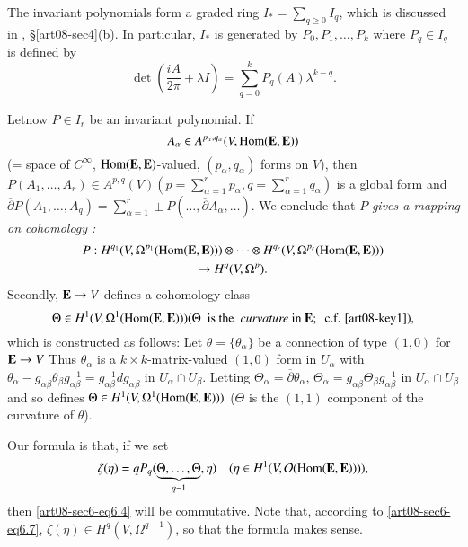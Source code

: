 The invariant polynomials form a graded ring $I_{*}=\sum\limits_{q\geq 0}I_{q}$, which is discussed in \cite{art08-key11}, \S\ref{art08-sec4}(b). In particular, $I_{*}$ is generated by $P_{0},P_{1},\ldots,P_{k}$ where $P_{q}\in I_{q}$ is defined by
\begin{equation}
\det\left(\dfrac{iA}{2\pi}+\lambda I\right)=\sum\limits^{k}_{q=0}P_{q}(A)\lambda^{k-q}.\label{art08-sec6-eq6.6}
\end{equation}

Let\pageoriginale now $P\in I_{r}$ be an invariant polynomial. If
$$
A_{\alpha}\in A^{p_{\alpha},q_{\alpha}}(V,\operatorname{\mathrm{Hom}}(\mathbf{E},\mathbf{E}))
$$
(= space of $C^{\infty}$, $\operatorname{\mathrm{Hom}}(\mathbf{E},\mathbf{E})$-valued, $(p_{\alpha},q_{\alpha})$ forms on $V$), then $P(A_{1},\ldots,A_{r})\in A^{p,q}(V)\left(p=\sum\limits^{r}_{\alpha=1}p_{\alpha},q=\sum\limits^{r}_{\alpha=1}q_{\alpha}\right)$ is a global form and $\overline{\partial}P(A_{1},\ldots,A_{q})=\sum\limits^{r}_{\alpha=1}\pm P(\ldots,\overline{\partial}A_{\alpha},\ldots)$. We conclude that $P$ {\em gives a mapping on cohomology :}
\begin{gather}
P : H^{q_{1}}(V,\Omega^{p_{1}}(\operatorname{\mathrm{Hom}}(\mathbf{E},\mathbf{E})))\otimes\cdots\otimes H^{q_{r}}(V,\Omega^{p_{r}}(\operatorname{\mathrm{Hom}}(\mathbf{E},\mathbf{E})))\notag\\
\to H^{q}(V,\Omega^{p}).\label{art08-sec6-eq6.7}
\end{gather}
Secondly, $\mathbf{E}\to V$ defines a cohomology class
$$
\Theta\in H^{1}(V,\Omega^{1}(\operatorname{\mathrm{Hom}}(\mathbf{E},\mathbf{E}))) (\Theta \text{~ is the~ {\em curvature} in } \mathbf{E};\text{~ c.f. \cite{art08-key1}}),
$$
which is constructed as follows: Let $\theta=\{\theta_{\alpha}\}$ be a connection of type $(1,0)$ for $\mathbf{E}\to V$ Thus $\theta_{\alpha}$ is a $k\times k$-matrix-valued $(1,0)$ form in $U_{\alpha}$ with $\theta_{\alpha}-g_{\alpha\beta}\theta_{\beta}g^{-1}_{\alpha\beta}=g^{-1}_{\alpha\beta}dg_{\alpha\beta}$ in $U_{\alpha}\cap U_{\beta}$. Letting $\Theta_{\alpha}=\overline{\partial}\theta_{\alpha}$, $\Theta_{\alpha}=g_{\alpha\beta}\Theta_{\beta}g^{-1}_{\alpha\beta}$ in $U_{\alpha}\cap U_{\beta}$ and so defines $\Theta\in H^{1}(V,\Omega^{1}(\operatorname{\mathrm{Hom}}(\mathbf{E},\mathbf{E})))$ ($\Theta$ is the $(1,1)$ component of the curvature of $\theta$).

Our formula is that, if we set
\begin{equation}
\zeta(\eta)=qP_{q}(\underbrace{\Theta,\ldots,\Theta}_{q-1},\eta)\quad (\eta\in H^{1}(V,\mathcal{O}(\operatorname{\mathrm{Hom}}(\mathbf{E},\mathbf{E})))),\label{art08-sec6-eq6.8}
\end{equation}
then \eqref{art08-sec6-eq6.4} will be commutative. Note that, according to \eqref{art08-sec6-eq6.7}, $\zeta(\eta)\in H^{q}(V,\Omega^{q-1})$, so that the formula makes sense.

